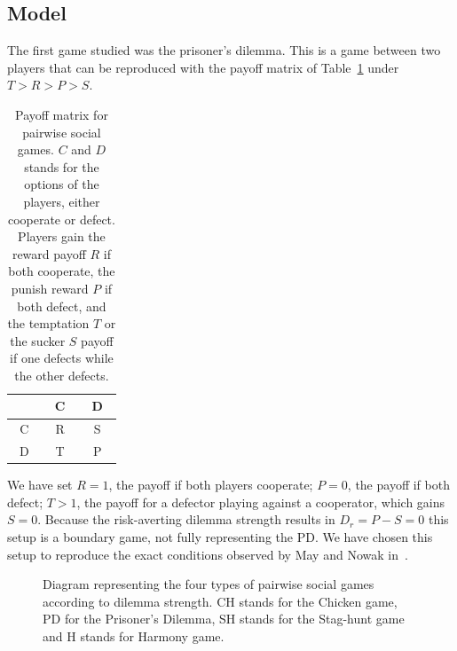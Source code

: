 \subsection{Model}

The first game studied was the prisoner's dilemma. This is a game between two players that can be reproduced with the payoff matrix of Table~\ref{tab:PayoffMatrix} under $T>R>P>S$.



\begin{table}[H]
\centering
\label{tab:PayoffMatrix}
    \begin{tabular}{c|c c}
        ~& ~C~ & ~D~  \\
        \hline
        ~C~ & R & S  \\
        ~D~ & T & P
    \end{tabular}
\caption{Payoff matrix for pairwise social games. $C$ and $D$ stands for the options of the players, either cooperate or defect. Players gain the reward payoff $R$ if both cooperate, the punish reward $P$ if both defect, and the temptation $T$ or the sucker $S$ payoff if one defects while the other defects.}
\end{table}



 We have set $R = 1$, the payoff if both players cooperate; $P = 0$, the payoff if both defect; $T > 1$,  the payoff for a defector playing against a cooperator, which gains $S = 0$. Because the risk-averting dilemma strength results in $D_r= P - S = 0$ this setup is a boundary game, not fully representing the PD. We have chosen this setup to reproduce the exact conditions observed by May and Nowak in~\cite{SpatialChaos}.


\begin{figure}
    \centering
{}
    \caption{Diagram representing the four types of pairwise social games according to dilemma strength. CH stands for the Chicken game, PD for the Prisoner's Dilemma, SH stands for the Stag-hunt game and H stands for Harmony game. }
    \label{fig:SocialGames}
\end{figure}


